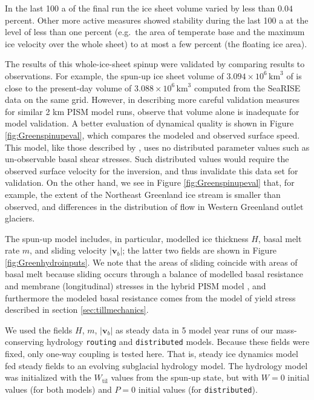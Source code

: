 \documentclass[gmd]{copernicus}   %
\newcommand{\text}{\textrm}
\newcommand\bv{\mathbf{v}}
\newcommand{\Wtil}{W_{\text{til}}}
\begin{document}
In the last 100 a of the final run the ice sheet volume varied by less than $0.04$ percent.  Other more active measures showed stability during the last 100 a at the level of less than one percent (e.g.~the area of temperate base and the maximum ice velocity over the whole sheet) to at most a few percent (the floating ice area).

The results of this whole-ice-sheet spinup were validated by comparing results to observations.  For example, the spun-up ice sheet volume of $3.094\times 10^{6}\,\textrm{km}^3$ of is close to the present-day volume of $3.088\times 10^{6}\,\textrm{km}^3$ computed from the SeaRISE data on the same grid.  However, in describing more careful validation measures for similar 2 km PISM model runs, \cite{AschwandenAdalgeirsdottirKhroulev} observe that volume alone is inadequate for model validation.  A better evaluation of dynamical quality is shown in Figure \ref{fig:Greenspinupeval}, which compares the modeled and observed surface speed.  This model, like those described by \cite{AschwandenAdalgeirsdottirKhroulev}, uses no distributed parameter values such as un-observable basal shear stresses.  Such distributed values would require the observed surface velocity for the inversion, and thus invalidate this data set for validation.  On the other hand, we see in Figure \ref{fig:Greenspinupeval} that, for example, the extent of the Northeast Greenland ice stream is smaller than observed, and differences in the distribution of flow in Western Greenland outlet glaciers.

The spun-up model includes, in particular, modelled ice thickness $H$, basal melt rate $m$, and sliding velocity $|\bv_b|$; the latter two fields are shown in Figure \ref{fig:Greenhydroinputs}.  We note that the areas of sliding coincide with areas of basal melt because sliding occurs through a balance of modelled basal resistance and membrane (longitudinal) stresses in the hybrid PISM model \citep{Winkelmannetal2011}, and furthermore the modeled basal resistance comes from the model of yield stress described in section \ref{sec:tillmechanics}.

We used the fields $H$, $m$, $|\bv_b|$ as steady data in 5 model year runs of our mass-conserving hydrology \texttt{routing} and \texttt{distributed} models.  Because these fields were fixed, only one-way coupling is tested here.  That is, steady ice dynamics model fed steady fields to an evolving subglacial hydrology model.  The hydrology model was initialized with the $\Wtil$ values from the spun-up state, but with $W=0$ initial values (for both models) and $P=0$ initial values (for \texttt{distributed}).
\end{document}
